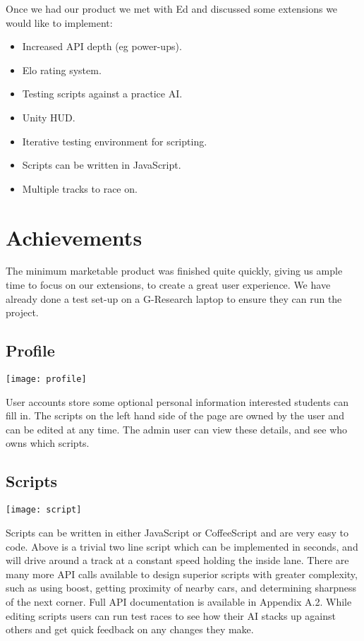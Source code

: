 Once we had our product we met with Ed and discussed some extensions we would like to implement:

\begin{itemize}
	\item Increased API depth (eg power-ups).
	\item Elo rating system.
	\item Testing scripts against a practice AI.
	\item Unity HUD.
	\item Iterative testing environment for scripting.
	\item Scripts can be written in JavaScript.
	\item Multiple tracks to race on.
\end{itemize}

\section{Achievements}

The minimum marketable product was finished quite quickly, giving us ample time to focus on our extensions, to create a great user experience. We have already done a test set-up on a G-Research laptop to ensure they can run the project.

\subsection{Profile}
\centerline{\texttt{[image: profile]}}
User accounts store some optional personal information interested students can fill in. The scripts on the left hand side of the page are owned by the user and can be edited at any time. The admin user can view these details, and see who owns which scripts.

\subsection{Scripts}
\centerline{\texttt{[image: script]}}
Scripts can be written in either JavaScript or CoffeeScript and are very easy to code. Above is a trivial two line script which can be implemented in seconds, and will drive around a track at a constant speed holding the inside lane. There are many more API calls available to design superior scripts with greater complexity, such as using boost, getting proximity of nearby cars, and determining sharpness of the next corner. Full API documentation is available in Appendix A.2. While editing scripts users can run test races to see how their AI stacks up against others and get quick feedback on any changes they make.

